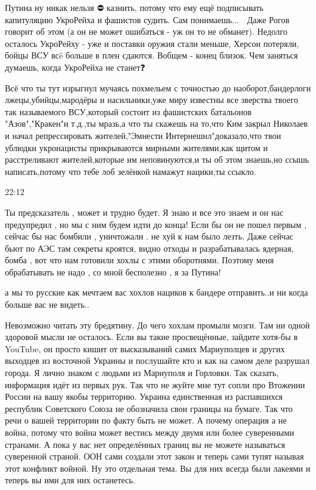 Путина ну никак нельзя ⛔ казнить, потому что ему ещё подписывать капитуляцию УкроРейха и фашистов судить.
Сам понимаешь... 🤔
Даже Рогов говорит об этом (а он не может ошибаться - уж он то не обманет).
Недолго осталось УкроРейху - уже и поставки оружия стали меньше, Херсон потеряли, бойцы ВСУ всë больше в плен сдаются. Вобщем - конец близок.
Чем заняться думаешь, когда УкроРейха не станет❓


Всё что ты тут изрыгнул мучаясь похмельем с точностью до наоборот,бандерлоги
лжецы,убийцы,мародёры и насильники,уже миру известны все зверства твоего так
называемого ВСУ,который состоит из фашистских батальонов "Азов","Кракен"и
т.д.,ты мразь,а что ты скажешь на то,что Ким закрыл Николаев и начал
репрессировать жителей,"Эмнести Интернешнл"доказало,что твои ублюдки
укронацисты прикрываются мирными жителями,как щитом и расстреливают
жителей,которые им неповинуются,и ты об этом знаешь,но ссышь написать,потому
что тебе лоб зелёнкой намажут нацики,ты ссыкло.

22:12

Ты предсказатель , может и трудно будет. Я знаю и все это знаем и он нас
предупредил , но мы с ним будем идти до конца! Если бы он не пошел первым ,
сейчас бы нас бомбили , уничтожали . не хуй к нам было лезть. Даже сейчас бьют
по АЭС там секреты кроятся, видно отходы и разрабатывалась ядерная, бомба , вот
что нам готовили хохлы с этими оборотнями. Поэтому меня обрабатывать не надо ,
со мной бесполезно , я за Путина!


а мы то русские как мечтаем вас хохлов нациков к бандере отправить..и ни когда
больше вас не видеть..


Невозможно читать эту бредятину. До чего хохлам промыли мозги. Там ни одной
здоровой мысли не осталось. Если вы такие просвещённые, зайдите хотя-бы в
YouTube, он просто кишит от высказываний самих Мариуполцев и других выходцев из
восточной Украины и послушайте кто и как на самом деле разрушал города. Я лично
знаком с людьми из Мариуполя и Горловки. Так сказать, информация идёт из первых
рук. Так что не жуйте мне тут сопли про Втожении России на вашу якобы
территорию. Украина единственная из распавшихся республик Советского Союза не
обозначила свои границы на бумаге. Так что речи о вашей территории по факту
быть не может. А почему операция а не война, потому что война может вестись
между двумя или более суверенными странами. А пока у вас нет определённых
границ вы не можете называться суверенной страной. ООН сами создали этот закон
и теперь сами тупят называя этот конфликт войной. Ну это отдельная тема. Вы для
них всегда были лакеями и теперь вы ими для них останетесь.

